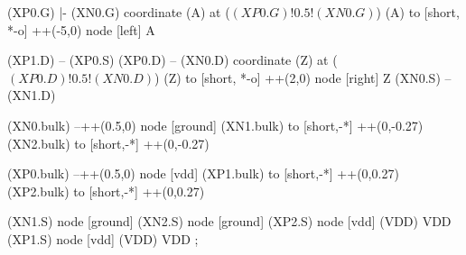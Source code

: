 \begin{circuitikz}[american]
	(XP0.G) |- (XN0.G)
	coordinate (A) at ($(XP0.G)!0.5!(XN0.G)$)
	(A) to [short, *-o] ++(-5,0) node [left] {A}
	
	(XP1.D) -- (XP0.S)
	(XP0.D) -- (XN0.D)
	coordinate (Z) at ($(XP0.D)!0.5!(XN0.D)$)
	(Z) to [short, *-o] ++(2,0) node [right] {Z}
	(XN0.S) -- (XN1.D)
	
	(XN0.bulk) --++(0.5,0) node [ground]{}	
	(XN1.bulk) to [short,-*] ++(0,-0.27)
	(XN2.bulk) to [short,-*] ++(0,-0.27)
	
	(XP0.bulk) --++(0.5,0) node [vdd]{}
	(XP1.bulk) to [short,-*] ++(0,0.27)		
	(XP2.bulk) to [short,-*] ++(0,0.27)		


	(XN1.S) node [ground] {}
	(XN2.S) node [ground] {}
	(XP2.S) node [vdd] (VDD) {VDD}
	(XP1.S) node [vdd] (VDD) {VDD}
;

\end{circuitikz}
